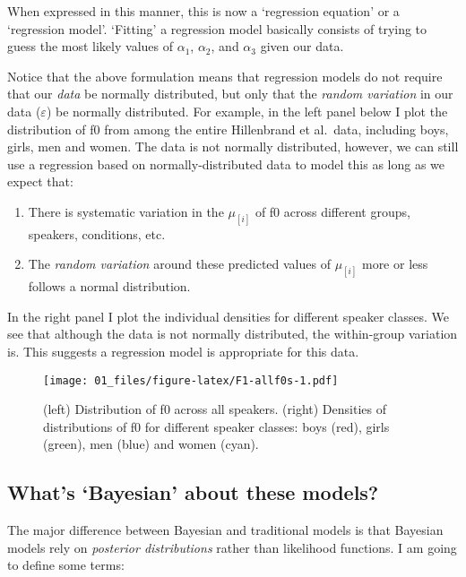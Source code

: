 \documentclass[
]{book}
\begin{document}
When expressed in this manner, this is now a `regression equation' or a `regression model'. `Fitting' a regression model basically consists of trying to guess the most likely values of \(\alpha_1\), \(\alpha_2\), and \(\alpha_3\) given our data.

Notice that the above formulation means that regression models do not require that our \emph{data} be normally distributed, but only that the \emph{random variation} in our data (\(\varepsilon\)) be normally distributed. For example, in the left panel below I plot the distribution of f0 from among the entire Hillenbrand et al.~data, including boys, girls, men and women. The data is not normally distributed, however, we can still use a regression based on normally-distributed data to model this as long as we expect that:

\begin{enumerate}
\def\labelenumi{\arabic{enumi})}
\item
  There is systematic variation in the \(\mu_{[i]}\) of f0 across different groups, speakers, conditions, etc.
\item
  The \emph{random variation} around these predicted values of \(\mu_{[i]}\) more or less follows a normal distribution.
\end{enumerate}

In the right panel I plot the individual densities for different speaker classes. We see that although the data is not normally distributed, the within-group variation is. This suggests a regression model is appropriate for this data.

\begin{figure}
\centering
\texttt{[image: 01\_files/figure-latex/F1-allf0s-1.pdf]}
\caption{\label{fig:F1-allf0s}(left) Distribution of f0 across all speakers. (right) Densities of distributions of f0 for different speaker classes: boys (red), girls (green), men (blue) and women (cyan).}
\end{figure}

\hypertarget{whats-bayesian-about-these-models}{%
\subsection{What's `Bayesian' about these models?}\label{whats-bayesian-about-these-models}}

The major difference between Bayesian and traditional models is that Bayesian models rely on \emph{posterior distributions} rather than likelihood functions. I am going to define some terms:
\end{document}
